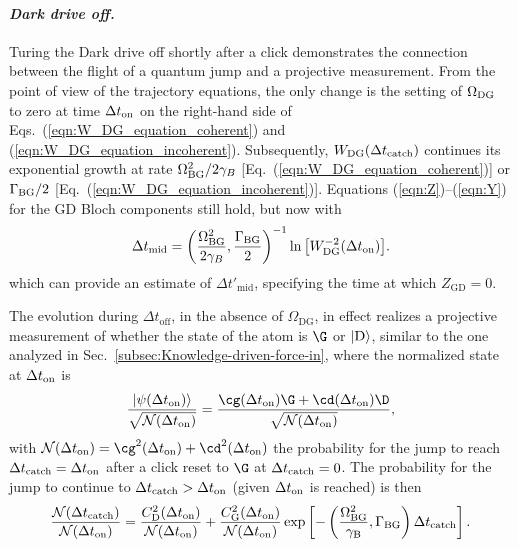 \paragraph{\textit{\emph{Dark drive off.}}}

Turing the Dark drive off shortly after a click demonstrates the connection
between the flight of a quantum jump and a projective measurement.
From the point of view of the trajectory equations, the only change
is the setting of $\Omega_{{\rm DG}}$ to zero at time $\Delta t_{{\rm on}}$
on the right-hand side of Eqs.~(\ref{eqn:W_DG_equation_coherent})
and (\ref{eqn:W_DG_equation_incoherent}). Subsequently, $W_{{\rm DG}}(\Delta t_{{\rm catch}})$
continues its exponential growth at rate $\Omega_{{\rm BG}}^{2}/2\gamma_{B}$
{[}Eq.~(\ref{eqn:W_DG_equation_coherent}){]} or $\Gamma_{{\rm BG}}/2$
{[}Eq.~(\ref{eqn:W_DG_equation_incoherent}){]}. Equations (\ref{eqn:Z})–(\ref{eqn:Y})
for the GD Bloch components still hold, but now with 
\begin{equation}
\Delta t_{{\rm mid}}=\left(\frac{\Omega_{{\rm BG}}^{2}}{2\gamma_{B}},\frac{\Gamma_{{\rm BG}}}{2}\right)^{-1}\ln\big[W_{{\rm DG}}^{-2}(\Delta t_{{\rm on}})\big].
\end{equation}
which can provide an estimate of $\Delta t'_{\mathrm{mid}}$, specifying
the time at which $Z_{\mathrm{GD}}=0$.

The evolution during $\Delta t_{\mathrm{off}}$, in the absence of
$\Omega_{\mathrm{DG}}$, in effect realizes a projective measurement
of whether the state of the atom is $\G$ or $|{\rm D}\rangle$, similar
to the one analyzed in Sec.~\ref{subsec:Knowledge-driven-force-in},
where the normalized state at $\Delta t_{{\rm on}}$ is 
\begin{equation}
\frac{|\psi(\Delta t_{{\rm on}})\rangle}{\sqrt{\mathcal{N}(\Delta t_{{\rm on}})}}=\frac{\cg(\Delta t_{{\rm on}})\G+\cd(\Delta t_{{\rm on}})\D}{\sqrt{\mathcal{N}(\Delta t_{{\rm on}})}},\label{eqn:initial_state}
\end{equation}
with $\mathcal{N}(\Delta t_{{\rm on}})=\cg^{2}(\Delta t_{{\rm on}})+\cd^{2}(\Delta t_{{\rm on}})$
the probability for the jump to reach $\Delta t_{{\rm catch}}=\Delta t_{{\rm on}}$
after a click reset to $\G$ at $\Delta t_{{\rm catch}}=0$. The probability
for the jump to continue to $\Delta t_{{\rm catch}}>\Delta t_{{\rm on}}$
(given $\Delta t_{{\rm on}}$ is reached) is then 
\begin{equation}
\frac{\mathcal{N}(\Delta t_{{\rm catch}})}{\mathcal{N}(\Delta t_{{\rm on}})}=\frac{C_{{\rm D}}^{2}(\Delta t_{{\rm on}})}{\mathcal{N}(\Delta t_{{\rm on}})}+\frac{C_{{\rm G}}^{2}(\Delta t_{{\rm on}})}{\mathcal{N}(\Delta t_{{\rm on}})}\exp\left[-\left(\frac{\Omega_{{\rm BG}}^{2}}{\gamma_{{\rm B}}},\Gamma_{{\rm BG}}\right)\Delta t_{{\rm catch}}\right].\label{eq:completion-prob}
\end{equation}


